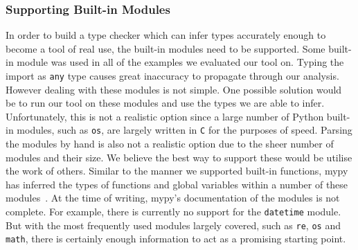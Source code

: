 \documentclass[12pt, titlepage]{article}
\begin{document}
\subsubsection*{Supporting Built-in Modules}
In order to build a type checker which can infer types accurately enough to become a tool of real use, the built-in modules need to be supported. Some built-in module was used in all of the examples we evaluated our tool on. Typing the import as \texttt{any} type causes great inaccuracy to propagate through our analysis. However dealing with these modules is not simple. One possible solution would be to run our tool on these modules and use the types we are able to infer. Unfortunately, this is not a realistic option since a large number of Python built-in modules, such as \texttt{os}, are largely written in \texttt{C} for the purposes of speed. Parsing the modules by hand is also not a realistic option due to the sheer number of modules and their size. We believe the best way to support these would be utilise the work of others. Similar to the manner we supported built-in functions, mypy has inferred the types of functions and global variables within a number of these modules~\cite{mypy}. At the time of writing, mypy's documentation of the modules is not complete. For example, there is currently no support for the \texttt{datetime} module. But with the most frequently used modules largely covered, such as \texttt{re}, \texttt{os} and \texttt{math}, there is certainly enough information to act as a promising starting point.
\end{document}
